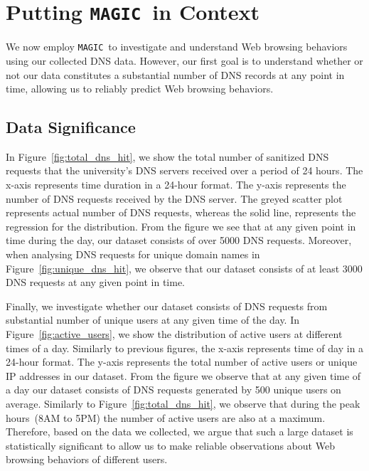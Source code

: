 \documentclass[letterpaper,twocolumn]{article}
\newcommand{\sol}{\texttt{MAGIC}}
\begin{document}
 


\vspace{-8pt}
\section{Putting \sol\ in Context}
\label{sec:results}
\vspace{-8pt}

We now employ \sol\ to investigate and understand Web browsing behaviors using our collected DNS data.
However, our first goal is to understand whether or not our data constitutes a substantial number of DNS records at any point in time, allowing us to reliably predict Web browsing behaviors.

\vspace{-8pt}
\subsection{Data Significance}
\vspace{-8pt}

In Figure~\ref{fig:total_dns_hit}, we show the total number of sanitized DNS requests that the university's DNS servers received over a period of 24 hours.
The x-axis represents time duration in a 24-hour format.
The y-axis represents the number of DNS requests received by the DNS server.
The greyed scatter plot represents actual number of DNS requests, whereas the solid line, represents the regression for the distribution. 
From the figure we see that at any given point in time during the day, our dataset consists of over 5000 DNS requests.
Moreover, when analysing DNS requests for unique domain names in Figure~\ref{fig:unique_dns_hit}, we observe that our dataset consists of at least 3000 DNS requests at any given point in time.

Finally, we investigate whether our dataset consists of DNS requests from substantial number of unique users at any given time of the day.
In Figure~\ref{fig:active_users}, we show the distribution of active users at different times of a day.
Similarly to previous figures, the x-axis represents time of day in a 24-hour format.
The y-axis represents the total number of active users or unique IP addresses in our dataset.
From the figure we observe that at any given time of a day our dataset consists of DNS requests generated by 500 unique users on average. 
Similarly to Figure~\ref{fig:total_dns_hit}, we observe that during the peak hours~(8AM to 5PM) the number of active users are also at a maximum.
Therefore, based on the data we collected, we argue that such a large dataset is statistically significant to allow us to make reliable observations about Web browsing behaviors of different users.
\end{document}
